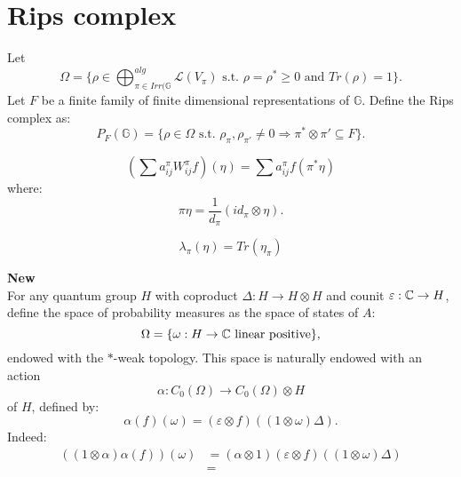 \section{Rips complex}

Let 
\[\Omega =\{\rho\in \bigoplus_{\pi \in Irr(\mathbb G }^{alg} \mathcal L(V_\pi) \text{ s.t. }\rho = \rho^* \geq 0 \text{ and } Tr(\rho ) =1\}.\] 
Let $F$ be a finite family of finite dimensional representations of $\mathbb G$. Define the Rips complex as:
\[ P_F(\mathbb G) = \{ \rho \in \Omega \text{ s.t. } \rho_\pi ,\rho_{\pi'}\neq 0 \Rightarrow \pi^* \otimes \pi' \subseteq F   \}. \]

\[ (\sum a_{ij}^\pi W^\pi_{ij}f)(\eta)  = \sum a_{ij}^\pi f(\pi^*\eta) \]
where:
\[\pi\eta  = \frac{1}{d_\pi}(id_\pi \otimes \eta).\]

\[\lambda_\pi(\eta) = Tr(\eta_\pi)\]

\textbf{New} \\

For any quantum group $H$ with coproduct $\Delta : H \rightarrow H \otimes H$ and counit $\varepsilon : \mathbb C \rightarrow H $, define the space of probability measures as the space of states of $A$:
\[\Omega = \{ \omega : H \rightarrow \mathbb C \text{ linear positive}\},\]
endowed with the $*$-weak topology. This space is naturally endowed with an action 
\[\alpha : C_0(\Omega) \rightarrow C_0(\Omega ) \otimes H \] 
of $H$, defined by:
\[\alpha(f) (\omega) = (\varepsilon \otimes f)((1\otimes \omega)\Delta ) .\]
Indeed:
\[\begin{split}
((1\otimes \alpha)\alpha (f)) (\omega)    & =  (\alpha\otimes 1) (\varepsilon \otimes f)((1\otimes \omega)\Delta ) \\ 
					& = 
\end{split}\]

 
